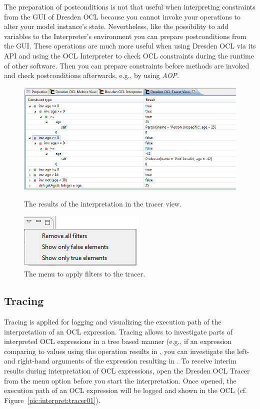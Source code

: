 The preparation of postconditions is not that useful when interpreting 
constraints from the GUI of Dresden OCL because you cannot invoke your
operations to alter your model instance's state. Nevertheless, like the
possibility to add variables to the Interpreter's environment you can prepare
postconditions from the GUI. These operations are much more useful when using
Dresden OCL via its API and using the OCL Interpreter to check OCL constraints
during the runtime of other software. Then you can prepare constraints before
methods are invoked and check postconditions afterwards, e.g., by using
\emph{\acf{AOP}}.

\begin{figure}[h]
	\centering
	\includegraphics[width=1.0\linewidth]{figures/interpreter/tracer01.png}
	\caption{The results of the interpretation in the tracer view.}
	\label{pic:interpret:tracer01}

	\vspace{3.0em}	
	
	\centering
	\includegraphics[scale=1]{figures/interpreter/tracer02.png}
	\caption{The menu to apply filters to the tracer.}
	\label{pic:interpret:tracer02}
\end{figure}

\subsection{Tracing}

Tracing is applied for logging and visualizing the execution path of the
interpretation of an OCL expression. Tracing allows to investigate parts of
interpreted OCL expressions in a tree based manner (e.g., if an expression
comparing to values using the \code{=} operation results in , you
can investigate the left- and right-hand arguments of the \code{=} expression
resulting in . To receive interim results during interpretation of
OCL expressions, open the Dresden OCL Tracer from the menu option
 before you start the
interpretation. Once opened, the execution path of an OCL expression will be
logged and shown in the OCL  (cf.
Figure~\ref{pic:interpret:tracer01}).


